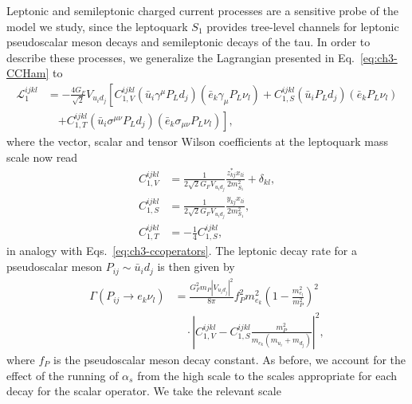 Leptonic and semileptonic charged current processes are a sensitive probe of the
model we study, since the leptoquark $S_{1}$ provides tree-level channels for
leptonic pseudoscalar meson decays and semileptonic decays of the tau. In order
to describe these processes, we generalize the Lagrangian presented in
Eq.~\eqref{eq:ch3-CCHam} to
\begin{equation} \label{eq:ch3-CCHam2}
  \begin{split}
    \mathscr{L}^{ijkl}_{1} &= -\frac{4 G_F}{\sqrt{2}} V_{u_i d_j} \left[
      C_{1,V}^{ijkl}(\bar{u}_i \gamma^\mu P_L d_j)(\bar{e}_k \gamma_\mu P_L
      \nu_{l}) + C^{ijkl}_{1,S} (\bar{u}_i P_L d_j)(\bar{e}_k P_L\nu_{l}) \right. \\
    &\quad \left. + C^{ijkl}_{1,T} (\bar{u}_i \sigma^{\mu \nu} P_L d_j)
      (\bar{e}_k \sigma_{\mu \nu} P_L \nu_{l})\right],
  \end{split}
\end{equation}
where the vector, scalar and tensor Wilson coefficients at the leptoquark mass
scale now read
\begin{subequations} \label{eq:ch3-ccoperators2}
  \begin{align}
    C_{1,V}^{ijkl} &= \frac{1}{2 \sqrt{2} G_F V_{u_i d_j}} \frac{z_{kj}^* x_{li}}{2m_{S_{1}}^2} + \delta_{kl},\\
    C_{1,S}^{ijkl} &= \frac{1}{2 \sqrt{2} G_F V_{u_i d_j}} \frac{y_{k j} x_{l i}}{2m_{S_{1}}^2},\\
    C_{1,T}^{ijkl} &= -\frac{1}{4} C_{1,S}^{ijkl}, \label{eq:ch3-ccops3}
  \end{align}
\end{subequations}
in analogy with Eqs.~\eqref{eq:ch3-ccoperators}. The leptonic decay rate for a
pseudoscalar meson $P_{ij} \sim \bar{u}_i d_j$ is then given
by~\cite{Becirevic:2016oho}
\begin{equation} \label{eq:ch3-plnu}
  \begin{split}
    \Gamma(P_{ij} \to e_k \nu_{l}) &= \frac{G_F^2 m_P |V_{u_i d_j}|^2}{8\pi} f_P^2 m_{e_k}^2 \left( 1 - \frac{m_{e_l}^2}{m_P^2} \right)^2\\ &\quad \cdot \left| C_{1,V}^{ijkl} - C_{1,S}^{ijkl} \frac{m_P^2}{m_{e_k}(m_{u_i} + m_{d_j})} \right|^2,
  \end{split}
\end{equation}
where $f_P$ is the pseudoscalar meson decay constant. As before, we account for
the effect of the running of $\alpha_s$ from the high scale to the scales
appropriate for each decay for the scalar operator. We take the relevant scale
